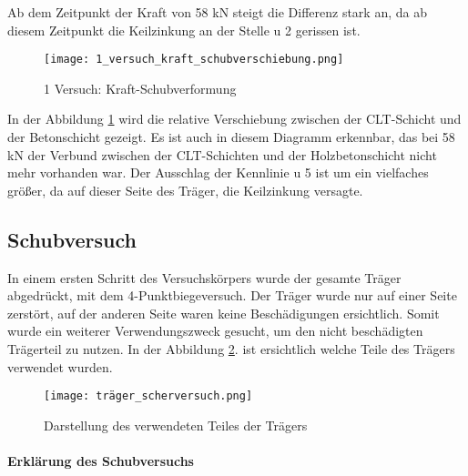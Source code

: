 \documentclass[12 pt,a4 paper ]{scrreprt}
\begin{document}
 Ab dem Zeitpunkt der Kraft von 58 kN steigt die Differenz stark an, da ab diesem Zeitpunkt die Keilzinkung an der Stelle u 2 gerissen ist. 


\begin{figure}
\begin{center}
\texttt{[image: 1\_versuch\_kraft\_schubverschiebung.png]}
\caption{1 Versuch: Kraft-Schubverformung}
\label{1_versuch_kraft_schubverschiebung}
\end{center}
\end{figure}

In der Abbildung \ref{1_versuch_kraft_schubverschiebung} wird die relative Verschiebung zwischen der CLT-Schicht und der Betonschicht gezeigt. Es ist auch in diesem Diagramm erkennbar, das bei 58 kN der Verbund zwischen der CLT-Schichten und der Holzbetonschicht nicht mehr vorhanden war. Der Ausschlag der Kennlinie u 5 ist um ein vielfaches größer, da auf dieser Seite des Träger, die Keilzinkung versagte. 

\subsection{Schubversuch}


In einem ersten Schritt des Versuchskörpers wurde der gesamte Träger abgedrückt, mit dem 4-Punktbiegeversuch. Der Träger wurde nur auf einer Seite zerstört, auf der anderen Seite waren keine Beschädigungen ersichtlich. Somit wurde ein weiterer Verwendungszweck gesucht, um den nicht beschädigten Trägerteil zu nutzen. In der Abbildung \ref{träger_scherversuch}. ist ersichtlich welche Teile des Trägers verwendet wurden. 


\begin{figure}[h]
\begin{center}
\texttt{[image: träger\_scherversuch.png]}
\caption{Darstellung des verwendeten Teiles der Trägers}
\label{träger_scherversuch}
\end{center}
\end{figure}

\paragraph{Erklärung des Schubversuchs}
\end{document}
